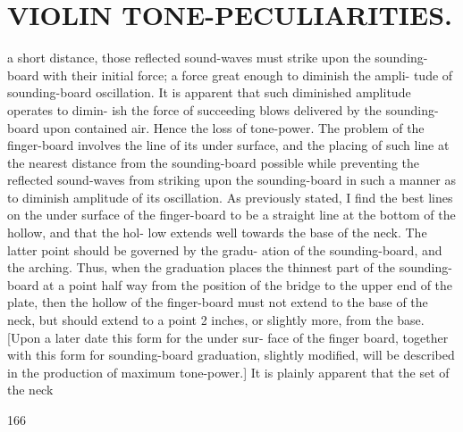 \documentclass{article}
\begin{document}
\section*{VIOLIN TONE-PECULIARITIES.}
a short distance, those reflected sound-waves must strike upon the sounding-board with their initial force; a force great enough to diminish the ampli- tude of sounding-board oscillation. It is apparent that such diminished amplitude operates to dimin- ish the force of succeeding blows delivered by the sounding-board upon contained air. Hence the loss of tone-power. The problem of the finger-board involves the line of its under surface, and the placing of such line at the nearest distance from the sounding-board possible while preventing the reflected sound-waves from striking upon the sounding-board in such a manner as to diminish amplitude of its oscillation. As previously stated, I find the best lines on the under surface of the finger-board to be a straight line at the bottom of the hollow, and that the hol- low extends well towards the base of the neck. The latter point should be governed by the gradu- ation of the sounding-board, and the arching. Thus, when the graduation places the thinnest part of the sounding-board at a point half way from the position of the bridge to the upper end of the plate, then the hollow of the finger-board must not extend to the base of the neck, but should extend to a point 2 inches, or slightly more, from the base. [Upon a later date this form for the under sur- face of the finger board, together with this form for sounding-board graduation, slightly modified, will be described in the production of maximum tone-power.] It is plainly apparent that the set of the neck

166
\end{document}
